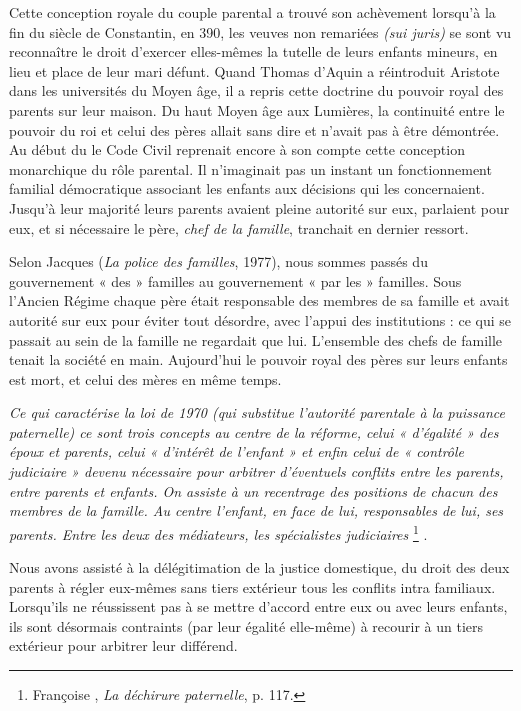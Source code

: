  Cette conception royale du couple parental a trouvé son achèvement lorsqu'à la fin du siècle de Constantin, en 390, les veuves non remariées \emph{(sui juris)} se sont vu reconnaître le droit d'exercer elles-mêmes la tutelle de leurs enfants mineurs, en lieu et place de leur mari défunt. Quand Thomas d'Aquin a réintroduit Aristote dans les universités du Moyen âge, il a repris cette doctrine du pouvoir royal des parents sur leur maison. Du haut Moyen âge aux Lumières, la continuité entre le pouvoir du roi et celui des pères allait sans dire et n'avait pas à être démontrée. Au début du  le Code Civil reprenait encore à son compte cette conception monarchique du rôle parental. Il n'imaginait pas un instant un fonctionnement familial démocratique associant les enfants aux décisions qui les concernaient. Jusqu'à leur majorité leurs parents avaient pleine autorité sur eux, parlaient pour eux, et si nécessaire le père, \emph{chef de la famille}, tranchait en dernier ressort.
 
 
Selon Jacques  (\emph{La police des familles}, 1977), nous sommes passés du gouvernement « des » familles au gouvernement « par les » familles. Sous l'Ancien Régime chaque père était responsable des membres de sa famille et avait autorité sur eux pour éviter tout désordre, avec l'appui des institutions : ce qui se passait au sein de la famille ne regardait que lui. L'ensemble des chefs de famille tenait la société en main. Aujourd'hui le pouvoir royal des pères sur leurs enfants est mort, et celui des mères en même temps.

\begin{displayquote}
{\emph{Ce qui caractérise la loi de 1970 (qui substitue l'autorité parentale à la puissance paternelle) ce sont trois concepts au centre de la réforme, celui « d'égalité » des époux et parents, celui « d'intérêt de l'enfant » et enfin celui de « contrôle judiciaire » devenu nécessaire pour arbitrer d'éventuels conflits entre les parents, entre parents et enfants. On assiste à un recentrage des positions de chacun des membres de la famille. Au centre l'enfant, en face de lui, responsables de lui, ses parents. Entre les deux des médiateurs, les spécialistes judiciaires}%
\footnote{Françoise , \emph{La déchirure paternelle}, p. 117.}%
}.
\end{displayquote}

Nous avons assisté à la délégitimation de la justice domestique, du droit des deux parents à régler eux-mêmes sans tiers extérieur tous les conflits intra familiaux. Lorsqu'ils ne réussissent pas à se mettre d'accord entre eux ou avec leurs enfants, ils sont désormais contraints (par leur égalité elle-même) à recourir à un tiers extérieur pour arbitrer leur différend.  


